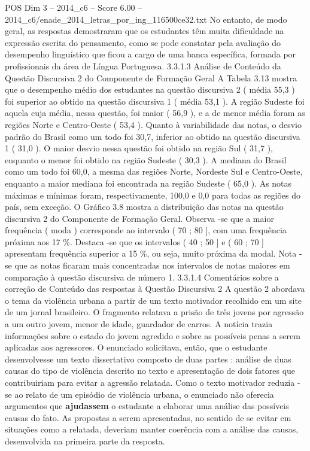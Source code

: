 \begin{textsample}{POS Dim 3 – 2014\_c6 – Score 6.00 – 2014\_c6/enade\_2014\_letras\_por\_ing\_116500ce32.txt}
No entanto, de modo geral, as respostas demostraram que os estudantes têm muita dificuldade na expressão escrita do pensamento, como se pode constatar pela avaliação do desempenho linguístico que ficou a cargo de uma banca específica, formada por profissionais da área de Língua Portuguesa. 3.3.1.3 Análise de Conteúdo da Questão Discursiva 2 do Componente de Formação Geral A Tabela 3.13 mostra que o desempenho médio dos estudantes na questão discursiva 2 ( média 55,3 ) foi superior ao obtido na questão discursiva 1 ( média 53,1 ).
A região Sudeste foi aquela cuja média, nessa questão, foi maior ( 56,9 ), e a de menor média foram as regiões Norte e Centro-Oeste ( 53,4 ).
Quanto à variabilidade das notas, o desvio padrão do Brasil como um todo foi 30,7, inferior ao obtido na questão discursiva 1 ( 31,0 ).
O maior desvio nessa questão foi obtido na região Sul ( 31,7 ), enquanto o menor foi obtido na região Sudeste ( 30,3 ).
A mediana do Brasil como um todo foi 60,0, a mesma das regiões Norte, Nordeste Sul e Centro-Oeste, enquanto a maior mediana foi encontrada na região Sudeste ( 65,0 ).
As notas máximas e mínimas foram, respectivamente, 100,0 e 0,0 para todas as regiões do país, sem exceção.
O Gráfico 3.8 mostra a distribuição das notas na questão discursiva 2 do Componente de Formação Geral.
Observa -se que a maior frequência ( moda ) corresponde ao intervalo ( 70 ; 80 ], com uma frequência próxima aos 17 \%.
Destaca -se que os intervalos ( 40 ; 50 ] e ( 60 ; 70 ] apresentam frequência superior a 15 \%, ou seja, muito próxima da modal.
Nota -se que as notas ficaram mais concentradas nos intervalos de notas maiores em comparação à questão discursiva de número 1. 3.3.1.4 Comentários sobre a correção de Conteúdo das respostas à Questão Discursiva 2 A questão 2 abordava o tema da violência urbana a partir de um texto motivador recolhido em um site de um jornal brasileiro.
O fragmento relatava a prisão de três jovens por agressão a um outro jovem, menor de idade, guardador de carros.
A notícia trazia informações sobre o estado do jovem agredido e sobre as possíveis penas a serem aplicadas aos agressores.
O enunciado solicitava, então, que o estudante desenvolvesse um texto dissertativo composto de duas partes : análise de duas causas do tipo de violência descrito no texto e apresentação de dois fatores que contribuiriam para evitar a agressão relatada.
Como o texto motivador reduzia -se ao relato de um episódio de violência urbana, o enunciado não oferecia argumentos que \textbf{ajudassem} o estudante a elaborar uma análise das possíveis causas do fato.
As propostas a serem apresentadas, no sentido de se evitar em situações como a relatada, deveriam manter coerência com a análise das causas, desenvolvida na primeira parte da resposta.

\end{textsample}
